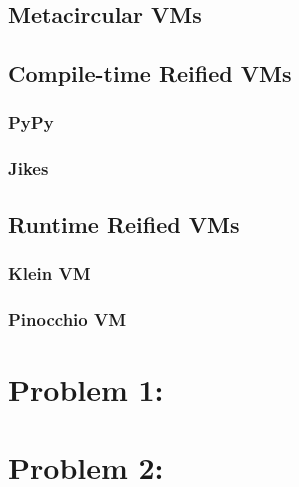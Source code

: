 \subsection{Metacircular VMs}


\subsection{Compile-time Reified VMs}
\subsubsection{PyPy}

\subsubsection{Jikes}

\subsection{Runtime Reified VMs}
\subsubsection{Klein VM}
\subsubsection{Pinocchio VM}


\section{Problem 1: }


\section{Problem 2: }


